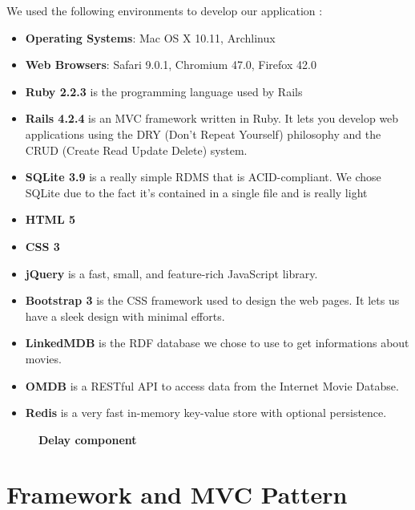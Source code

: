 \documentclass[12pt,a4paper]{article}
\begin{document}
We used the following environments to develop our application :

\begin{itemize}
\item \textbf{Operating Systems}: Mac OS X 10.11, Archlinux
\item \textbf{Web Browsers}: Safari 9.0.1, Chromium 47.0, Firefox 42.0
\item \textbf{Ruby 2.2.3} is the programming language used by Rails
\item \textbf{Rails 4.2.4} is an MVC framework written in Ruby. It lets you develop web applications using the DRY (Don't Repeat Yourself) philosophy and the CRUD (Create Read Update Delete) system.

\item \textbf{SQLite 3.9} is a really simple RDMS that is ACID-compliant. We chose SQLite due to the fact it's contained in a single file and is really light
\item \textbf{HTML 5} 
\item \textbf{CSS 3}
\item \textbf{jQuery} is a fast, small, and feature-­rich JavaScript library.
\item \textbf{Bootstrap 3} is the CSS framework used to design the web pages. It lets us have a sleek design with minimal efforts.
\item \textbf{LinkedMDB} is the RDF database we chose to use to get informations about movies.
\item \textbf{OMDB} is a RESTful API to access data from the Internet Movie Databse.
\item \textbf{Redis} is a very fast in-memory key-value store with optional persistence.
\end{itemize}

\begin{figure}[h]
\begin{center}
\end{center}
\caption{\textbf{Delay component}}
\label{splitdelay}
\end{figure}

\section{Framework and MVC Pattern}
\end{document}
